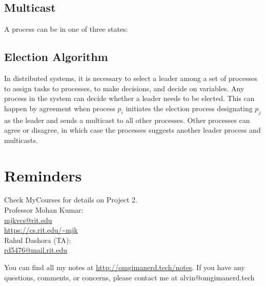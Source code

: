 \documentclass{math}
\begin{document}
\subsection*{Multicast}
A process can be in one of three states:
\begin{center}
\end{center}

\subsection*{Election Algorithm}
In distributed systems, it is necessary to select a leader among a set of
processes to assign tasks to processes, to make decisions, and decide on
variables. Any process in the system can decide whether a leader needs to be
elected. This can happen by agreement when process \( p_i \) initiates the
election process designating \( p_j \) as the leader and sends a multicast
to all other processes. Other processes can agree or disagree, in which case
the processes suggests another leader process and multicasts.

\section*{Reminders}
Check MyCourses for details on Project 2. \\
\noindent Professor Mohan Kumar: \\
\url{mjkvcs@rit.edu} \\
\url{https://cs.rit.edu/~mjk} \\

\noindent Rahul Dashora (TA): \\
\url{rd5476@mail.rit.edu} \\

\begin{center}
  You can find all my notes at \url{http://omgimanerd.tech/notes}. If you have
  any questions, comments, or concerns, please contact me at
  alvin@omgimanerd.tech
\end{center}
\end{document}
